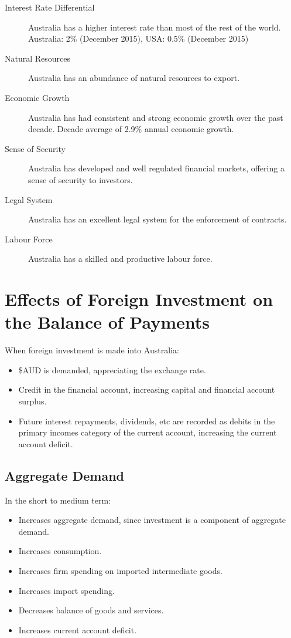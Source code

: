 \documentclass[a4paper,11pt]{report}
\begin{document}
\begin{description}
\item [Interest Rate Differential] Australia has a higher interest rate than
	most of the rest of the world. Australia: 2\% (December 2015), USA: 0.5\%
	(December 2015)
\item [Natural Resources] Australia has an abundance of natural resources
	to export.
\item [Economic Growth] Australia has had consistent and strong economic growth
	over the past decade. Decade average of 2.9\% annual economic growth.
\item [Sense of Security] Australia has developed and well regulated financial
	markets, offering a sense of security to investors.
\item [Legal System] Australia has an excellent legal system for the
	enforcement of contracts.
\item [Labour Force] Australia has a skilled and productive labour force.
\end{description}


\section{Effects of Foreign Investment on the Balance of Payments}

When foreign investment is made into Australia:

\begin{itemize}
\item \$AUD is demanded, appreciating the exchange rate.
\item Credit in the financial account, increasing capital and financial account
	surplus.
\item Future interest repayments, dividends, etc are recorded as debits in the
	primary incomes category of the current account, increasing the current
	account deficit.
\end{itemize}

\subsection{Aggregate Demand}

In the short to medium term:

\begin{itemize}
\item Increases aggregate demand, since investment is a component of aggregate
	demand.
\item Increases consumption.
\item Increases firm spending on imported intermediate goods.
\item Increases import spending.
\item Decreases balance of goods and services.
\item Increases current account deficit.
\end{itemize}
\end{document}
